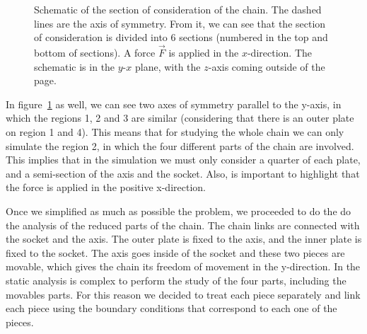 \documentclass[a4paper 12pt]{article}
\begin{document}
\begin{figure}[!htbp]
\begin{center}
\end{center}
\caption{Schematic of the section of consideration of the chain. The dashed lines are the axis of symmetry. From it, we can see that the section of consideration is divided into 6 sections (numbered in the top and bottom of sections). A force $\vec{F}$ is applied in the $x$-direction. The schematic is in the $y$-$x$ plane, with the $z$-axis coming outside of the page.}
\label{chain_union}
\end{figure}

In figure~\ref{chain_union} as well, we can see two axes of symmetry parallel to the y-axis, in which the regions 1, 2 and 3 are similar (considering that there is an outer plate on region 1 and 4). This means that for studying the whole chain we can only simulate the region 2, in which the four different parts of the chain are involved. This implies that in the simulation we must only consider a quarter of each plate, and a semi-section of the axis and the socket. Also, is important to highlight that the force is applied in the positive x-direction.

Once we simplified as much as possible the problem, we proceeded to do the do the analysis of the reduced parts of the chain. The chain links are connected with the socket and the axis. The outer plate is fixed to the axis, and the inner plate is fixed to the socket. The axis goes inside of the socket and these two pieces are movable, which gives the chain its freedom of movement in the y-direction. In the static analysis is complex to perform the study of the four parts, including the movables parts. For this reason we decided to treat each piece separately and link each piece using the boundary conditions that correspond to each one of the pieces.
\end{document}
